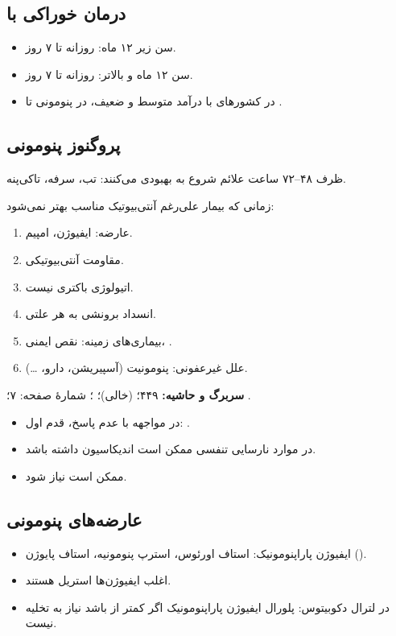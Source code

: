 \documentclass[12pt,a4paper]{article}
\begin{document}
\subsection*{درمان خوراکی با }
\begin{itemize}
\item سن زیر ۱۲ ماه:  روزانه تا ۷ روز.
\item سن ۱۲ ماه و بالاتر:  روزانه تا ۷ روز.
\item در کشورهای با درآمد متوسط و ضعیف، در پنومونی تا . 
\end{itemize}
\subsection*{پروگنوز پنومونی}
ظرف ۴۸–۷۲ ساعت علائم شروع به بهبودی می‌کنند: تب، سرفه، تاکی‌پنه.

زمانی که بیمار علی‌رغم آنتی‌بیوتیک مناسب بهتر نمی‌شود:
\begin{enumerate}
\item عارضه: ایفیوژن، امپیم.
\item مقاومت آنتی‌بیوتیکی.
\item اتیولوژی باکتری نیست.
\item انسداد برونشی به هر علتی.
\item بیماری‌های زمینه: نقص ایمنی، .
\item علل غیرعفونی: پنومونیت (آسپیریشن، دارو، \ldots). 
\end{enumerate}

\textbf{سربرگ و حاشیه:} ۴۴۹؛  (خالی)؛ ؛ شمارهٔ صفحه: ۷؛ .
\begin{itemize}
\item در مواجهه با عدم پاسخ، قدم اول: .
\item در موارد نارسایی تنفسی ممکن است  اندیکاسیون داشته باشد.
\item {} ممکن است نیاز شود.
\end{itemize}
\subsection*{عارضه‌های پنومونی}
\begin{itemize}
\item ایفیوژن پاراپنومونیک: استاف اورئوس، استرپ پنومونیه، استاف پایوژن ().
\item اغلب ایفیوژن‌ها استریل هستند.
\item در لترال دکوبیتوس: پلورال ایفیوژن پاراپنومونیک اگر کمتر از \lr{1 cm} باشد نیاز به تخلیه نیست.
\end{itemize}
\end{document}
